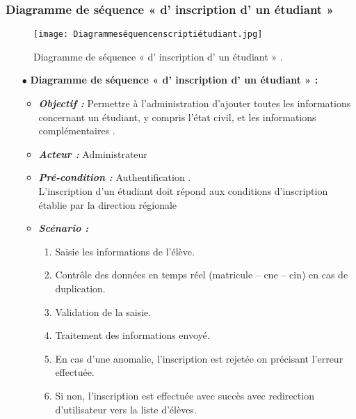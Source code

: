 \subsubsection{Diagramme de séquence « d' inscription d' un étudiant » }
\begin{figure}[ht]
	\centering
	\texttt{[image: Diagrammeséquencenscriptiétudiant.jpg]}
	\caption{Diagramme de séquence « d' inscription d' un étudiant » .}
	\label{fig:Diagramme de séquence  d' inscription d' un étudiant   }
\end{figure}
\FloatBarrier


\begin{itemize}
	\item[$\bullet$] \textbf{Diagramme de séquence « d' inscription d' un étudiant » :} 
	\medskip
	\begin{itemize}
		\item \textit{\textbf{Objectif :}} Permettre à l'administration d'ajouter toutes les informations
		concernant un étudiant, y compris l’état civil, et les
		informations complémentaires .	
		\item \textit{\textbf{Acteur :}} Administrateur	
		\item \textit{\textbf{Pré-condition  :}} Authentification .\\
		L’inscription d’un étudiant doit répond aux conditions d’inscription établie par
		la direction régionale
		\item \textit{\textbf{Scénario :}}
		\begin{enumerate}
		\item Saisie les informations de l’élève.
		\item Contrôle des données en temps réel (matricule – cne – cin) en cas de duplication.
		\item Validation de la saisie.
		\item Traitement des informations envoyé.
		\item En cas d’une anomalie, l’inscription est rejetée on précisant l’erreur effectuée.
		\item Si non, l’inscription est effectuée avec succès avec redirection d’utilisateur vers la
			liste d’élèves.
		\end{enumerate}
	\end{itemize}
\end{itemize}	
\bigskip

















